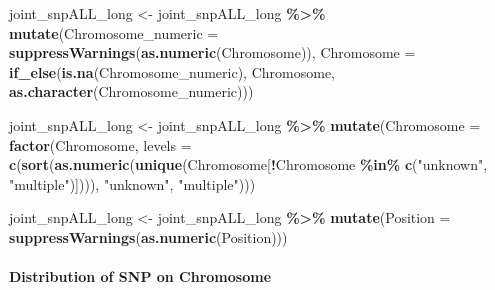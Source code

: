 \documentclass[
]{article}
\newenvironment{Shaded}{\begin{snugshade}}{\end{snugshade}}
\newcommand{\AttributeTok}[1]{\textcolor[rgb]{0.13,0.29,0.53}{#1}}
\newcommand{\FunctionTok}[1]{\textcolor[rgb]{0.13,0.29,0.53}{\textbf{#1}}}
\newcommand{\NormalTok}[1]{#1}
\newcommand{\OtherTok}[1]{\textcolor[rgb]{0.56,0.35,0.01}{#1}}
\newcommand{\SpecialCharTok}[1]{\textcolor[rgb]{0.81,0.36,0.00}{\textbf{#1}}}
\newcommand{\StringTok}[1]{\textcolor[rgb]{0.31,0.60,0.02}{#1}}
\begin{document}
\begin{Shaded}
\begin{Highlighting}[]
\NormalTok{joint\_snpALL\_long }\OtherTok{\textless{}{-}}\NormalTok{ joint\_snpALL\_long }\SpecialCharTok{\%\textgreater{}\%}
  \FunctionTok{mutate}\NormalTok{(}\AttributeTok{Chromosome\_numeric =} \FunctionTok{suppressWarnings}\NormalTok{(}\FunctionTok{as.numeric}\NormalTok{(Chromosome)),  }
         \AttributeTok{Chromosome =} \FunctionTok{if\_else}\NormalTok{(}\FunctionTok{is.na}\NormalTok{(Chromosome\_numeric), Chromosome, }\FunctionTok{as.character}\NormalTok{(Chromosome\_numeric))) }


\NormalTok{joint\_snpALL\_long }\OtherTok{\textless{}{-}}\NormalTok{ joint\_snpALL\_long }\SpecialCharTok{\%\textgreater{}\%}
  \FunctionTok{mutate}\NormalTok{(}\AttributeTok{Chromosome =} \FunctionTok{factor}\NormalTok{(Chromosome, }\AttributeTok{levels =} \FunctionTok{c}\NormalTok{(}\FunctionTok{sort}\NormalTok{(}\FunctionTok{as.numeric}\NormalTok{(}\FunctionTok{unique}\NormalTok{(Chromosome[}\SpecialCharTok{!}\NormalTok{Chromosome }\SpecialCharTok{\%in\%} \FunctionTok{c}\NormalTok{(}\StringTok{"unknown"}\NormalTok{, }\StringTok{"multiple"}\NormalTok{)]))), }\StringTok{"unknown"}\NormalTok{, }\StringTok{"multiple"}\NormalTok{)))}


\NormalTok{joint\_snpALL\_long }\OtherTok{\textless{}{-}}\NormalTok{ joint\_snpALL\_long }\SpecialCharTok{\%\textgreater{}\%}
  \FunctionTok{mutate}\NormalTok{(}\AttributeTok{Position =} \FunctionTok{suppressWarnings}\NormalTok{(}\FunctionTok{as.numeric}\NormalTok{(Position))) }
\end{Highlighting}
\end{Shaded}

\paragraph{Distribution of SNP on
Chromosome}\label{distribution-of-snp-on-chromosome}
\end{document}
